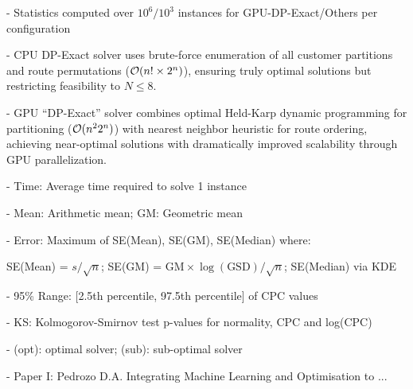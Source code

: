 \documentclass[a4paper,twoside]{article}
\begin{document}
\begin{table}[htbp]
\begin{tabular}{@{}l c c r r r r c c c c@{}}
\bottomrule
\end{tabular}
\begin{tablenotes}
\small
\item - Statistics computed over $10^6/10^3$ instances for GPU-DP-Exact/Others per configuration
\item - CPU DP-Exact solver uses brute-force enumeration of all customer partitions and route permutations (${\cal O}(n! \times 2^n)$), ensuring truly optimal solutions but restricting feasibility to $N\le 8$.
\item - GPU ``DP-Exact'' solver combines optimal Held-Karp dynamic programming for partitioning (${\cal O}(n^2 2^n)$) with nearest neighbor heuristic for route ordering, achieving near-optimal solutions with dramatically improved scalability through GPU parallelization.
\item - Time: Average time required to solve 1 instance
\item - Mean: Arithmetic mean; GM: Geometric mean
\item - Error: Maximum of SE(Mean), SE(GM), SE(Median) where:
\item \quad SE(Mean) = $s/\sqrt{n}$; SE(GM) = $\text{GM} \times \log(\text{GSD})/\sqrt{n}$; SE(Median) via KDE
\item - 95\% Range: [2.5th percentile, 97.5th percentile] of CPC values
\item - KS: Kolmogorov-Smirnov test p-values for normality, CPC and log(CPC)
\item - (opt): optimal solver; (sub): sub-optimal solver
\item - Paper I: Pedrozo D.A. Integrating Machine Learning and Optimisation to ...
\end{tablenotes}
\end{table}
\end{document}
